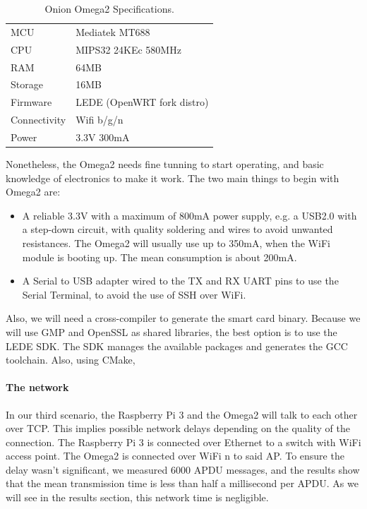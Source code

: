 \begin{table}[h]
	\myfloatalign
	\begin{tabularx}{0.75\textwidth}{ll} \toprule
		MCU & Mediatek MT688 \citep{MT7688} \\
		CPU & MIPS32 24KEc 580MHz \\
		RAM & 64MB \\
		Storage & 16MB \\
		Firmware & LEDE (OpenWRT fork distro) \\
		Connectivity & Wifi b/g/n \\
		Power & 3.3V 300mA \\
		\bottomrule
	\end{tabularx}
	\caption[Onion Omega 2 Specifications]{Onion Omega2 Specifications.}
	\label{tab:Omega2Specs}
\end{table}



Nonetheless, the Omega2 needs fine tunning to start operating, and basic knowledge of electronics to make it work. The two main things to begin with Omega2 are:
\begin{itemize}
	\item A reliable 3.3V with a maximum of 800mA power supply, e.g. a USB2.0 with a step-down circuit, with quality soldering and wires to avoid unwanted resistances. The Omega2 will usually use up to 350mA, when the WiFi module is booting up. The mean consumption is about 200mA.
	\item A Serial to USB adapter wired to the TX and RX UART pins to use the Serial Terminal, to avoid the use of SSH over WiFi.
\end{itemize}


Also, we will need a cross-compiler to generate the smart card binary. Because we will use GMP and OpenSSL as shared libraries, the best option is to use the LEDE SDK. The SDK manages the available packages and generates the GCC toolchain. Also, using CMake, 


\paragraph{The network} In our third scenario, the Raspberry Pi 3 and the Omega2 will talk to each other over TCP. This implies possible network delays depending on the quality of the connection. The Raspberry Pi 3 is connected over Ethernet to a switch with WiFi access point. The Omega2 is connected over WiFi n to said AP. To ensure the delay wasn't significant, we measured 6000 APDU messages, and the results show that the mean transmission time is less than half a millisecond per APDU. As we will see in the results section, this network time is negligible.

